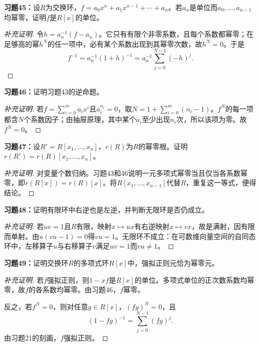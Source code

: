 \begin{problem}
\textbf{习题45：}设$R$为交换环，$f=a_0x^n+a_1x^{n-1}+\cdots+a_n$。若$a_n$是单位而$a_0,\ldots,a_{n-1}$均幂零，证明$f$是$R[x]$的单位。
\end{problem}
\begin{proof}[补充证明]
令$h=a_n^{-1}(f-a_n)$。它只有有限个非零系数，且每个系数都幂零；在足够高的幂$h^N$的任一项中，必有某个系数出现到其幂零次数，故$h^N=0$。于是
\[
f^{-1}=a_n^{-1}(1+h)^{-1}
=a_n^{-1}\sum_{j=0}^{N-1}(-h)^j.
\]
\end{proof}

\begin{problem}
\textbf{习题46：}证明习题43的逆命题。
\end{problem}
\begin{proof}[补充证明]
若$f=\sum_{i=0}^m a_ix^i$且$a_i^{n_i}=0$，取$N=1+\sum_{i=0}^m(n_i-1)$。$f^N$的每一项都含$N$个系数因子；由抽屉原理，其中某个$a_i$至少出现$n_i$次，所以该项为零。故$f^N=0$。
\end{proof}

\begin{problem}
\textbf{习题47：}设$R'=R[x_1,\ldots,x_n]$，$r(R)$为$R$的幂零根。证明$r(R')=r(R)[x_1,\ldots,x_n]$。
\end{problem}
\begin{proof}[补充证明]
对变量个数归纳。习题43和46说明一元多项式幂零当且仅当各系数幂零，即$r(R[x])=r(R)[x]$。将$R[x_1,\ldots,x_{n-1}]$代替$R$，重复这一等式，便得结论。
\end{proof}

\begin{problem}
\textbf{习题48：}证明有限环中右逆也是左逆，并判断无限环是否仍成立。
\end{problem}
\begin{proof}[补充证明]
若$uv=1$且$R$有限，映射$x\mapsto ux$有右逆映射$x\mapsto vx$，故是满射，因有限而单射。由$u(vu-1)=0$得$vu=1$。无限环不成立：在可数维向量空间的自同态环中，左移算子$u$与右移算子$v$满足$uv=1$而$vu\ne1$。
\end{proof}

\begin{problem}
\textbf{习题49：}证明交换环$R$的多项式环$R[x]$中，强拟正则元恰为幂零元。
\end{problem}
\begin{proof}[补充证明]
若$f$强拟正则，则$1-xf$是$R[x]$的单位。多项式单位的正次数系数均幂零，故$f$的各系数均幂零。由习题46，$f$幂零。

反之，若$f^N=0$，则对任意$g\in R[x]$，$(fg)^N=0$，且
\[
(1-fg)^{-1}=\sum_{j=0}^{N-1}(fg)^j.
\]
由习题21的刻画，$f$强拟正则。
\end{proof}

